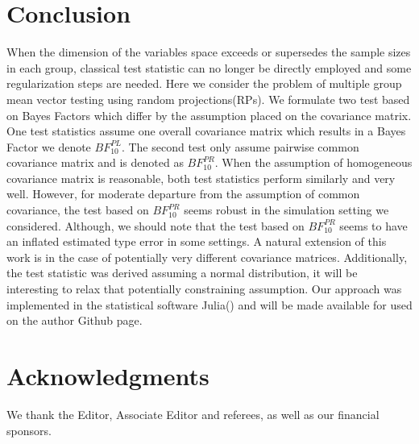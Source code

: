 \documentclass[times,sort&compress,3p]{elsarticle}
\theoremstyle{plain}%
\theoremstyle{definition}
\begin{document}
\section{Conclusion} \label{sec:conclusion}
When the dimension of the variables space exceeds or supersedes the sample sizes in each group, classical test statistic can no longer be directly employed and some regularization steps are needed. Here we consider the problem of multiple group mean vector testing using random projections(RPs). We formulate two test based on Bayes Factors which differ by the assumption placed on the covariance matrix. One test statistics assume one overall covariance matrix which results in a Bayes Factor we denote $BF^{PL}_{10}$. The second test only assume pairwise common covariance matrix and is denoted as $BF^{PR}_{10}$. When the assumption of homogeneous covariance matrix is reasonable, both test statistics perform similarly and very well. However, for moderate departure from the assumption of common covariance, the test based on $BF^{PR}_{10}$ seems robust in the simulation setting we considered. Although, we should note that the test based on $BF^{PR}_{10}$ seems to have an inflated estimated type error in some settings.  A natural extension of this work is in the case of potentially very different covariance matrices. Additionally, the test statistic was derived assuming a normal distribution, it will be interesting to relax that potentially constraining assumption. Our approach was implemented in the statistical software \textsf{Julia}(\cite{bezanson2012julia}) and will be made available for used on the author Github page.   

\section*{Acknowledgments}

We thank the Editor, Associate Editor and referees, as well as our financial sponsors.



\end{document}
